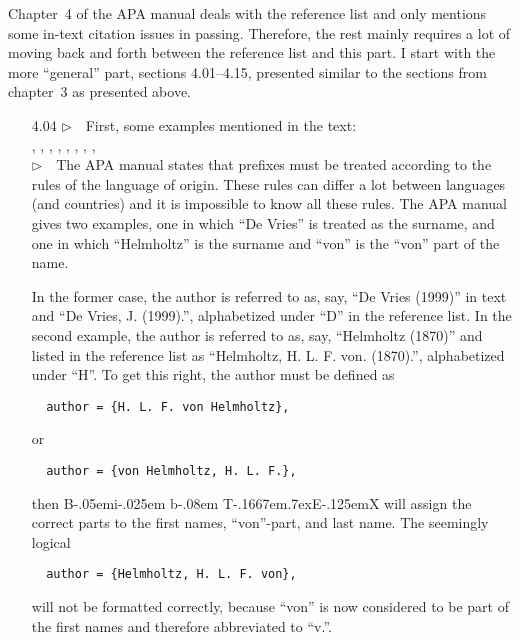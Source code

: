 \documentclass{article}
\def\BibTeX{{\rm B\kern-.05em{\sc i\kern-.025em b}\kern-.08em
    T\kern-.1667em\lower.7ex\hbox{E}\kern-.125emX}}%
\newcommand{\EM}{\ensuremath{\triangleright\quad}}
\begin{document}
\noindent
Chapter~4 of the APA manual deals with the reference list
and only mentions some in-text citation issues in passing.
Therefore, the rest mainly requires a lot of moving back and forth
between the reference list and this part. I start with the
more ``general'' part, sections 4.01--4.15, presented similar to
the sections from chapter~3 as presented above.
\begin{itemize}
\item[4.04] \EM First, some examples mentioned in the text:\\
            ,
            ,
            ,
            ,
            ,
            ,
            ,
            ,
            \\
            \EM The APA manual states that prefixes must be treated
            according to the rules of the language of origin. These rules
            can differ a lot between languages (and countries) and it
            is impossible to know all these rules. The APA manual gives two
            examples, one in which ``De Vries'' is treated as the surname,
            and one in which ``Helmholtz'' is the surname and ``von'' is
            the ``von'' part of the name.

            In the former case, the author is referred to as, say, ``De Vries
            (1999)'' in text and ``De Vries, J. (1999).'', alphabetized under
            ``D'' in the reference list. In the second example, the author is
            referred to as, say, ``Helmholtz (1870)'' and listed in the
            reference list as ``Helmholtz, H. L. F. von. (1870).'',
            alphabetized under ``H''. To get this right, the author must be
            defined as
\begin{verbatim}
  author = {H. L. F. von Helmholtz},
\end{verbatim}
            or
\begin{verbatim}
  author = {von Helmholtz, H. L. F.},
\end{verbatim}
            then \BibTeX{} will assign the correct parts to the first names,
            ``von''-part, and last name. The seemingly logical
\begin{verbatim}
  author = {Helmholtz, H. L. F. von},
\end{verbatim}
            will not be formatted correctly, because ``von'' is now
            considered to be part of the first names and therefore
            abbreviated to ``v.''.


\end{itemize}
\end{document}
